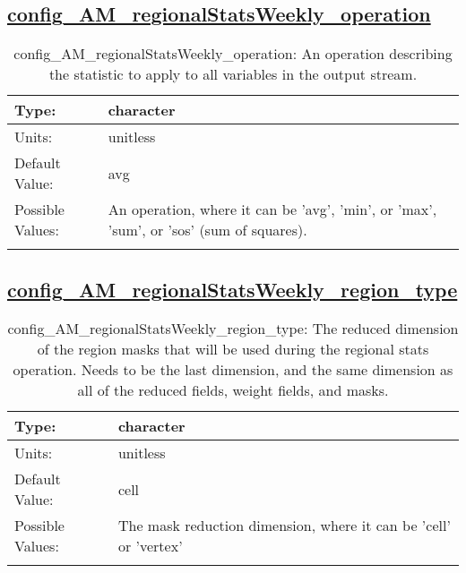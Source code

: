 \subsection[config\_AM\_regionalStatsWeekly\_operation]{\hyperref[sec:nm_tab_AM_regionalStatsWeekly]{config\_AM\_regionalStatsWeekly\_operation}}
\label{subsec:nm_sec_config_AM_regionalStatsWeekly_operation}
\begin{center}
\begin{longtable}{| p{2.0in} || p{4.0in} |}
    \hline
    Type: & character \\
    \hline
    Units: & \si{unitless} \\
    \hline
    Default Value: & avg \\
    \hline
    Possible Values: & An operation, where it can be 'avg', 'min', or 'max', 'sum', or 'sos' (sum of squares). \\
    \hline
    \caption{config\_AM\_regionalStatsWeekly\_operation: An operation describing the statistic to apply to all variables in the output stream.}
\end{longtable}
\end{center}
\subsection[config\_AM\_regionalStatsWeekly\_region\_type]{\hyperref[sec:nm_tab_AM_regionalStatsWeekly]{config\_AM\_regionalStatsWeekly\_region\_type}}
\label{subsec:nm_sec_config_AM_regionalStatsWeekly_region_type}
\begin{center}
\begin{longtable}{| p{2.0in} || p{4.0in} |}
    \hline
    Type: & character \\
    \hline
    Units: & \si{unitless} \\
    \hline
    Default Value: & cell \\
    \hline
    Possible Values: & The mask reduction dimension, where it can be 'cell' or 'vertex' \\
    \hline
    \caption{config\_AM\_regionalStatsWeekly\_region\_type: The reduced dimension of the region masks that will be used during the regional stats operation. Needs to be the last dimension, and the same dimension as all of the reduced fields, weight fields, and masks.}
\end{longtable}
\end{center}
